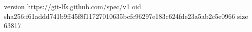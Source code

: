 version https://git-lfs.github.com/spec/v1
oid sha256:f61addd741b9ff45f8f11727010635bcfc96297e183c624fde23a5ab2c5e0966
size 63817

